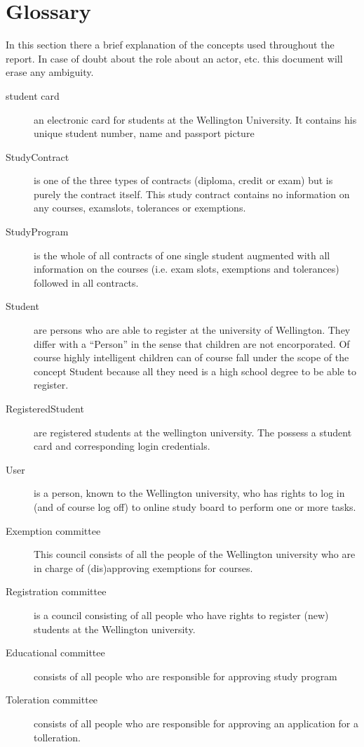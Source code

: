 \chapter{Glossary}
\label{glossary}

\npar In this section there a brief explanation of the concepts used throughout
the report. In case of doubt about the role about an actor, etc. this document
will erase any ambiguity.

\begin{description}
\item[student card] an electronic card for students at the Wellington University.
It contains his unique student number, name and passport picture
\item[StudyContract] is one of the three types of contracts (diploma, credit or
exam) but is purely the contract itself. This study contract contains no
information on any courses, examslots, tolerances or exemptions.
\item[StudyProgram] is the whole of all contracts of one single student
augmented with all information on the courses (i.e. exam slots, exemptions and
tolerances) followed in all contracts.
\item[Student] are persons who are able to register at the university of
Wellington. They differ with a ``Person'' in the sense that children are
not encorporated. Of course highly intelligent children can of course fall under
the scope of the concept Student because all they need is a high school degree
to be able to register.
\item[RegisteredStudent] are registered students at the wellington university.
The possess a student card and corresponding login credentials.
\item[User] is a person, known to the Wellington university, who has rights to
log in (and of course log off) to online study board to perform one or more
tasks.
\item[Exemption committee] This council consists of all the people of the
Wellington university who are in charge of (dis)approving exemptions for
courses.
\item[Registration committee] is a council consisting of all people who have
rights to register (new) students at the Wellington university.
\item[Educational committee] consists of all people who are responsible for
approving study program
\item[Toleration committee] consists of all people who are responsible for approving
an application for a tolleration.

\end{description}
